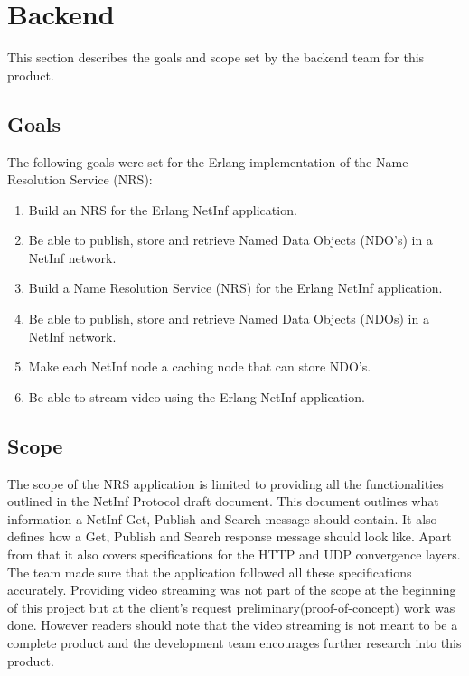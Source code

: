 \section{Backend}
This section describes the goals and scope set by the backend team for this product.

\subsection{Goals}
The following goals were set for the Erlang implementation of the Name Resolution Service (NRS):
\begin{enumerate}

\item {Build an NRS for the Erlang NetInf application.}\\ 
\item {Be able to publish, store and retrieve Named Data Objects (NDO's) in a NetInf network.}\\
\item {Build a Name Resolution Service (NRS) for the Erlang NetInf application.}\\
\item {Be able to publish, store and retrieve Named Data Objects (NDOs) in a NetInf network.}\\
\item {Make each NetInf node a caching node that can store NDO's.}\\
\item {Be able to stream video using the Erlang NetInf application.}\\
\end{enumerate}

\subsection{Scope}
The scope of the NRS application is limited to providing all the functionalities outlined in the NetInf Protocol draft document. \cite{netinfproto} This document outlines what information a NetInf Get, Publish and Search message should contain. It also defines how a Get, Publish and Search response message should look like. Apart from that it also covers specifications for the HTTP and UDP convergence layers. The team made sure that the application followed all these specifications accurately. Providing video streaming was not part of the scope at the beginning of this project but at the client's request preliminary(proof-of-concept) work was done. However readers should note that the video streaming is not meant to be a complete product and the development team encourages further research into this product.
